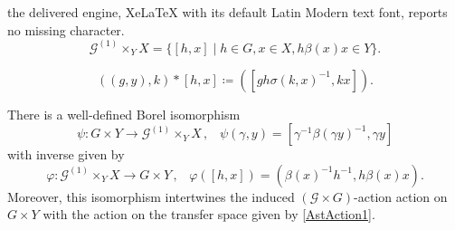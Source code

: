 \documentclass[10pt,a4paper]{amsart}
\newcommand{\cG}{\mathcal{G}}
\renewcommand{\phi}{\varphi}
\begin{document}
the delivered engine, XeLaTeX with its default Latin Modern text font, reports no missing character.
\begin{equation}\label{FiberProdRed}
\cG^{(1)}\times_{Y} X = \{[h,x] \mid h \in G, x \in X,  h\beta(x)x \in Y\}.
\end{equation}

\begin{equation}\label{AstAction1}
((g, y), k) \ast [h,x] \coloneqq ([gh\sigma(k,x)^{-1}, kx]). \tag{$\ast$}
\end{equation}

\begin{prop}\label{psiIso} There is a well-defined Borel isomorphism
\begin{equation}\label{psi}
  \psi: G\times Y\to \mathcal{G}^{(1)} \times_Y X\,,\;\;\; \psi(\gamma,y)=[\gamma^{-1}\beta(\gamma y)^{-1}, \gamma y]\end{equation}
 with inverse given by
  $$\phi: \mathcal{G}^{(1)} \times_Y X \to G\times Y\,,\;\;\; \phi([h,x])=(\beta(x)^{-1} h^{-1} , h \beta(x) x).$$
 Moreover, this isomorphism intertwines the induced $(\cG \times G)$-action action on $G\times Y$ with the action on the transfer space given by \eqref{AstAction1}.
\end{prop}
\end{document}
